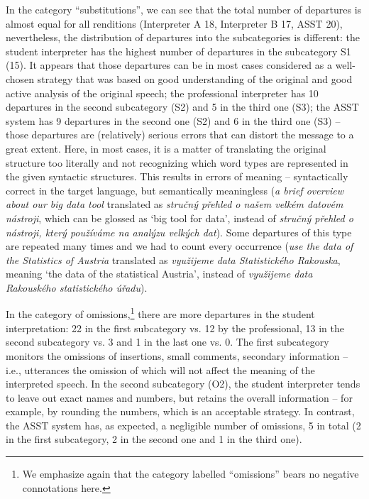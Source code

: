 \documentclass[output=paper]{langscibook}
\begin{document}
In the category “substitutions”, we can see that the total number of departures is almost equal for all renditions (Interpreter A 18, Interpreter B 17, ASST 20), nevertheless, the distribution of departures into the subcategories is different: the student interpreter has the highest number of departures in the subcategory S1 (15). It appears that those departures can be in most cases considered as a well-chosen strategy that was based on good understanding of the original and good active analysis of the original speech; the professional interpreter has 10 departures in the second subcategory (S2) and 5 in the third one (S3); the ASST system has 9 departures in the second one (S2) and 6 in the third one (S3) – those departures are (relatively) serious errors that can distort the message to a great extent. Here, in most cases, it is a matter of translating the original structure too literally and not recognizing which word types are represented in the given syntactic structures. This results in errors of meaning – syntactically correct in the target language, but semantically meaningless (\textit{a brief overview about our big data tool} translated as \textit{stručný přehled o našem velkém datovém nástroji}, which can be glossed as ‘big tool for data’, instead of \textit{stručný přehled o nástroji, který používáme na analýzu velkých dat}). Some departures of this type are repeated many times and we had to count every occurrence (\textit{use the data of the Statistics of Austria} translated as \textit{využijeme data Statistického Rakouska}, meaning ‘the data of the statistical Austria’, instead of \textit{využijeme data Rakouského statistického úřadu}).

In the category of omissions,\footnote{{We emphasize again that the category labelled “omissions” bears no negative connotations here.}} there are more departures in the student interpretation: 22 in the first subcategory vs. 12 by the professional, 13 in the second subcategory vs. 3 and 1 in the last one vs. 0. The first subcategory monitors the omissions of insertions, small comments, secondary information – i.e., utterances the omission of which will not affect the meaning of the interpreted speech. In the second subcategory (O2), the student interpreter tends to leave out exact names and numbers, but retains the overall information – for example, by rounding the numbers, which is an acceptable strategy. In contrast, the ASST system has, as expected, a negligible number of omissions, 5 in total (2 in the first subcategory, 2 in the second one and 1 in the third one).
\end{document}
